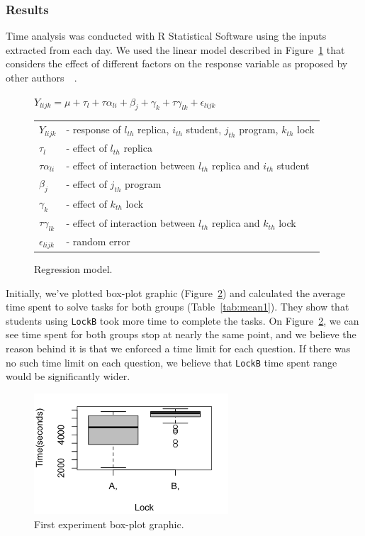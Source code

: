 \subsubsection{Results}

Time analysis was conducted with R Statistical Software using the inputs extracted from each day.
We used the linear model described in Figure~\ref{fig:model} that considers the effect of different factors
on the response variable as proposed by other authors~\citep{paola}~\citep{sanchez}.

\begin{figure}
\begin{center}
$Y_{lijk} = \mu + \tau_{l} + \tau\alpha_{li} + \beta_{j} + \gamma_{k} + \tau\gamma_{lk} + \epsilon_{lijk}$\\
\vspace{4mm}
\begin{tabular}{ll}
$Y_{lijk}$ & - response of $l_{th}$ replica, $i_{th}$ student, $j_{th}$ program, $k_{th}$ lock \\
$\tau_{l}$ & - effect of $l_{th}$ replica \\
$\tau\alpha_{li}$ & - effect of interaction between $l_{th}$ replica and $i_{th}$ student \\
$\beta_{j}$ & - effect of $j_{th}$ program \\
$\gamma_{k}$ & - effect of $k_{th}$ lock \\
$\tau\gamma_{lk}$ & - effect of interaction between $l_{th}$ replica and $k_{th}$ lock \\
$\epsilon_{lijk}$ & - random error \\
\end{tabular}
\caption{Regression model.}\label{fig:model}
\end{center}
\end{figure}

Initially, we've plotted box-plot graphic (Figure~\ref{fig:boxplot1}) and calculated the average time spent to solve tasks for both groups (Table~\ref{tab:mean1}).
They show that students using {\tt LockB} took more time to complete the tasks.
On Figure~\ref{fig:boxplot1}, we can see time spent for both groups stop at nearly the same point, and we believe the reason behind it is that we enforced a time limit for each question.
If there was no such time limit on each question, we believe that {\tt LockB} time spent range would be significantly wider.

\begin{figure}
\centering
\includegraphics[height=4.5cm]{img/u1.png}
\caption{First experiment box-plot graphic.}\label{fig:boxplot1}
\end{figure}

